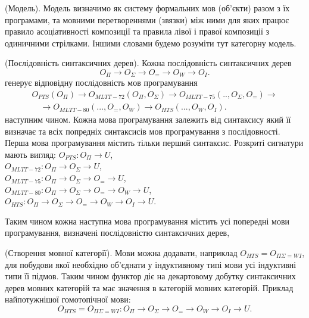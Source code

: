 \begin{definition} (Модель).
Модель визначимо як систему формальних мов (об'єкти) разом з їх програмами,
та мовними перетвореннями (звязки) між ними для яких працює правило асоціативності
композиції та правила лівої і правої композиції з одиничними стрілками.
Іншими словами будемо розуміти тут категорну модель.
\end{definition}

\begin{definition} (Послідовність синтаксичних дерев). Кожна послідовність
синтаксичних дерев
\begin{equation}
O_{\Pi} \rightarrow O_{\Sigma} \rightarrow O_{=} \rightarrow O_{W} \rightarrow O_{I}.
\end{equation}
генерує відповідну послідовність мов програмування
\begin{equation}
\begin{split}
O_{PTS}(O_\Pi) \rightarrow O_{MLTT-72}(O_\Pi,O_\Sigma) \rightarrow O_{MLTT-75}(..,O_\Sigma,O_=) \rightarrow \\
 \quad \rightarrow O_{MLTT-80}(...,O_=,O_W) \rightarrow O_{HTS}(...,O_{W},O_I).
\end{split}
\end{equation}
наступним чином. Кожна мова програмування залежить
від синтаксису який її визначає
та всіх попредніх синтаксисів мов програмування з послідовності.
Перша мова програмування містить тільки перший синтаксис.
Розкриті сигнатури мають вигляд:
$O_{PTS}: O_\Pi \rightarrow U$, \\
$O_{MLTT-72}: O_\Pi \rightarrow O_\Sigma \rightarrow U$, \\
$O_{MLTT-75}: O_\Pi \rightarrow O_\Sigma \rightarrow O_= \rightarrow U$, \\
$O_{MLTT-80}: O_\Pi \rightarrow O_\Sigma \rightarrow O_= \rightarrow O_W \rightarrow U$, \\
$O_{HTS}: O_\Pi \rightarrow O_\Sigma \rightarrow O_= \rightarrow O_W \rightarrow O_I \rightarrow U$.
\end{definition}

Таким чином кожна наступна мова програмування містить усі попередні
мови програмування, визначені послідовністю синтаксичних дерев,

\begin{definition} (Створення мовної категорії).
Мови можна додавати, наприклад $O_{HTS} = O_{\Pi\Sigma=WI}$, для побудови якої необхідно
об'єднати у індуктивному типі мови усі індуктивні типи її підмов.
Таким чином функтор діє на декартовому добутку синтаксичних дерев мовних категорій
та має значення в категорій мовних категорій. Приклад найпотужнішої гомотопічної мови:
\begin{equation}
O_{HTS} = O_{\Pi\Sigma=WI} : O_\Pi \rightarrow O_\Sigma \rightarrow O_= \rightarrow O_W \rightarrow O_I \rightarrow U.
\end{equation}
\end{definition}

